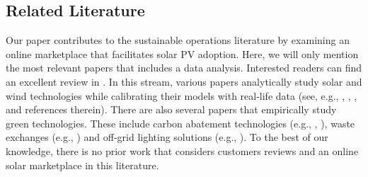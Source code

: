 \documentclass[msom,blindrev]{informs3}
\begin{document}
%


\subsection{Related Literature} \label{Sec: Lit}

Our paper contributes to the sustainable operations literature by examining an online marketplace that facilitates solar PV adoption. Here, we will only mention the most relevant papers that includes a data analysis. Interested readers can find an excellent review in \cite{HLee}. In this stream, various papers analytically study solar and wind technologies while calibrating their models with real-life data (see, e.g., \cite{alanwolf}, \cite{NJ}, \cite{SunarandBirge}, and references therein). There are also several papers that empirically study green technologies. These include carbon abatement technologies (e.g., \cite{blanco2020carbon}, \cite{Corbett2}), waste exchanges (e.g., \cite{Suvrat}) and  off-grid lighting solutions (e.g., \cite{uppari}).
To the best of our knowledge, there is no prior work that considers customers reviews and an online solar marketplace in this literature.

\end{document}
